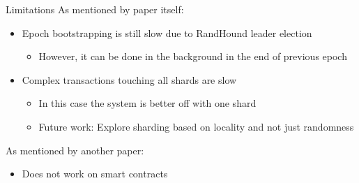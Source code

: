 \begin{frame}{Limitations}
    As mentioned by paper itself:
    \begin{itemize}
        \item Epoch bootstrapping is still slow due to RandHound leader election
            \begin{itemize}
                \item However, it can be done in the background in the end of previous epoch
            \end{itemize}
        \item Complex transactions touching all shards are slow
            \begin{itemize}
                \item In this case the system is better off with one shard
                \item Future work: Explore sharding based on locality and not just randomness
            \end{itemize}
    \end{itemize}

    As mentioned by another paper:
    \begin{itemize}
        \item Does not work on smart contracts
    \end{itemize}
\end{frame}

